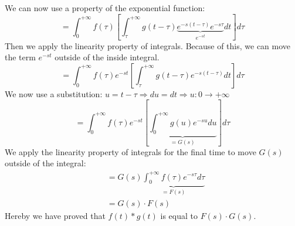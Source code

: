 \documentclass[]{subfiles}
\begin{document}
	We can now use a property of the exponential function:
	\begin{equation}
		=\int_{0}^{+\infty}f(\tau)\left[ \int_{\tau}^{+\infty}g(t-\tau)\underbrace{e^{-s(t-\tau)}e^{-s\tau}}_{e^{-st}}dt\right]d\tau 
	\end{equation}
	Then we apply the linearity property of integrals. Because of this, we can move the term $e^{-st}$ outside of the inside integral.
	\begin{equation}
		=\int_{0}^{+\infty}f(\tau)e^{-st}\left[ \int_{\tau}^{+\infty}g(t-\tau)e^{-s(t-\tau)}dt\right] d\tau
	\end{equation}%
	\newpage%
	We now use a substitution: $u = t-\tau  \Rightarrow du = dt \Rightarrow u: 0\rightarrow+\infty$
	\begin{equation}
		=\int_{0}^{+\infty}f(\tau)e^{-st}\left[ \underbrace{\int_{0}^{+\infty}g(u)e^{-su}du}_{=G(s)}\right] d\tau
	\end{equation}
	We apply the linearity property of integrals for the final time to move $G(s)$ outside of the integral:
	\begin{align}
		&=G(s)\underbrace{\int_{0}^{+\infty}f(\tau)e^{-s\tau}d\tau}_{=F(s)}\\
		&=G(s)\cdot F(s)
	\end{align}
	Hereby we have proved that $f(t)\ast g(t)$ is equal to $F(s)\cdot G(s)$.
\end{document}

